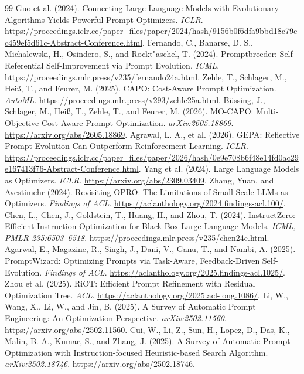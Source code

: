 \documentclass{article}
\begin{document}
\begin{thebibliography}{99}\small
{} Guo et al. (2024). Connecting Large Language Models with Evolutionary Algorithms Yields Powerful Prompt Optimizers. \emph{ICLR}. \url{https://proceedings.iclr.cc/paper_files/paper/2024/hash/9156b0f6dfa9bbd18c79cc459ef5d61c-Abstract-Conference.html}.
 Fernando, C., Banarse, D. S., Michalewski, H., Osindero, S., and Rockt"{a}schel, T. (2024). Promptbreeder: Self-Referential Self-Improvement via Prompt Evolution. \emph{ICML}. \url{https://proceedings.mlr.press/v235/fernando24a.html}.
 Zehle, T., Schlager, M., Hei\ss, T., and Feurer, M. (2025). CAPO: Cost-Aware Prompt Optimization. \emph{AutoML}. \url{https://proceedings.mlr.press/v293/zehle25a.html}.
 B\"ussing, J., Schlager, M., Hei\ss, T., Zehle, T., and Feurer, M. (2026). MO-CAPO: Multi-Objective Cost-Aware Prompt Optimization. \emph{arXiv:2605.18869}. \url{https://arxiv.org/abs/2605.18869}.
 Agrawal, L. A., et al. (2026). GEPA: Reflective Prompt Evolution Can Outperform Reinforcement Learning. \emph{ICLR}. \url{https://proceedings.iclr.cc/paper_files/paper/2026/hash/0e9e708b6f48e14fd0ac29e167413f76-Abstract-Conference.html}.
 Yang et al. (2024). Large Language Models as Optimizers. \emph{ICLR}. \url{https://arxiv.org/abs/2309.03409}.
 Zhang, Yuan, and Avestimehr (2024). Revisiting OPRO: The Limitations of Small-Scale LLMs as Optimizers. \emph{Findings of ACL}. \url{https://aclanthology.org/2024.findings-acl.100/}.
 Chen, L., Chen, J., Goldstein, T., Huang, H., and Zhou, T. (2024). InstructZero: Efficient Instruction Optimization for Black-Box Large Language Models. \emph{ICML, PMLR 235:6503--6518}. \url{https://proceedings.mlr.press/v235/chen24e.html}.
 Agarwal, E., Magazine, R., Singh, J., Dani, V., Ganu, T., and Nambi, A. (2025). PromptWizard: Optimizing Prompts via Task-Aware, Feedback-Driven Self-Evolution. \emph{Findings of ACL}. \url{https://aclanthology.org/2025.findings-acl.1025/}.
 Zhou et al. (2025). RiOT: Efficient Prompt Refinement with Residual Optimization Tree. \emph{ACL}. \url{https://aclanthology.org/2025.acl-long.1086/}.
 Li, W., Wang, X., Li, W., and Jin, B. (2025). A Survey of Automatic Prompt Engineering: An Optimization Perspective. \emph{arXiv:2502.11560}. \url{https://arxiv.org/abs/2502.11560}.
 Cui, W., Li, Z., Sun, H., Lopez, D., Das, K., Malin, B. A., Kumar, S., and Zhang, J. (2025). A Survey of Automatic Prompt Optimization with Instruction-focused Heuristic-based Search Algorithm. \emph{arXiv:2502.18746}. \url{https://arxiv.org/abs/2502.18746}.

\end{thebibliography}
\end{document}
